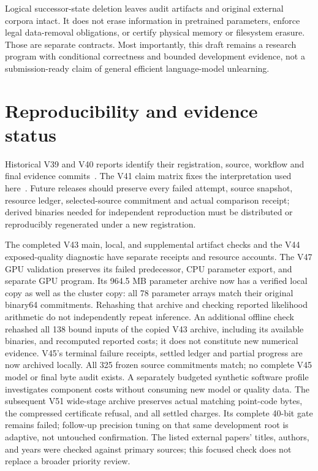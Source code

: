 \documentclass[10pt,twocolumn,letterpaper]{article}
\begin{document}
Logical successor-state deletion leaves audit artifacts and original external
corpora intact. It does not erase information in pretrained parameters, enforce
legal data-removal obligations, or certify physical memory or filesystem erasure.
Those are separate contracts. Most importantly, this draft remains a research
program with conditional correctness and bounded development evidence, not a
submission-ready claim of general efficient language-model unlearning.

\section{Reproducibility and evidence status}
Historical V39 and V40 reports identify their registration, source, workflow and
final evidence commits~\cite{v39,v40}. The V41 claim matrix fixes the interpretation
used here~\cite{boundaries}. Future releases should preserve every failed attempt,
source snapshot, resource ledger, selected-source commitment and actual comparison
receipt; derived binaries needed for independent reproduction must be distributed
or reproducibly regenerated under a new registration.

The completed V43 main, local, and supplemental artifact checks and the V44
exposed-quality diagnostic have separate receipts and resource accounts. The
V47 GPU validation preserves its failed predecessor, CPU parameter export, and
separate GPU program. Its 964.5 MB parameter archive now has a verified local
copy as well as the cluster copy: all 78 parameter arrays match their original
binary64 commitments. Rehashing that archive and checking reported likelihood
arithmetic do not independently repeat inference.
An additional offline check rehashed all 138 bound inputs of the copied V43
archive, including its available binaries, and recomputed reported costs; it
does not constitute new numerical evidence. V45's terminal failure receipts,
settled ledger and partial progress are now archived locally. All 325 frozen
source commitments match; no complete V45 model or final byte audit exists.
A separately budgeted synthetic software profile investigates component costs
without consuming new model or quality data. The subsequent V51 wide-stage
archive preserves actual matching point-code bytes, the compressed certificate
refusal, and all settled charges. Its complete 40-bit gate remains failed;
follow-up precision tuning on that same development root is adaptive, not
untouched confirmation. The listed external papers' titles,
authors, and years were checked against primary
sources; this focused check does not replace a broader priority review.
\end{document}
